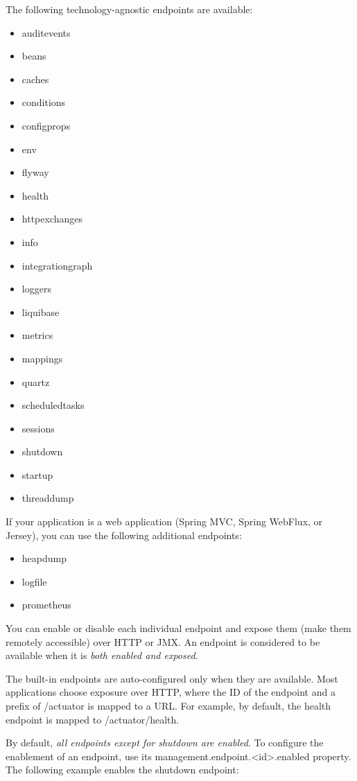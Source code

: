 \documentclass{scrartcl}
\begin{document}
The following technology-agnostic endpoints are available:

\begin{itemize}
    \item auditevents
    \item beans
    \item caches
    \item conditions
    \item configprops
    \item env
    \item flyway
    \item health
    \item httpexchanges
    \item info
    \item integrationgraph
    \item loggers
    \item liquibase
    \item metrics
    \item mappings
    \item quartz
    \item scheduledtasks
    \item sessions
    \item shutdown
    \item startup
    \item threaddump
\end{itemize}

If your application is a web application (Spring MVC, Spring WebFlux, or Jersey), you can use the following additional endpoints:

\begin{itemize}
    \item heapdump
    \item logfile
    \item prometheus
\end{itemize}

You can enable or disable each individual endpoint and expose them (make them remotely accessible) over HTTP or JMX. An endpoint is considered to be available when it is \textit{both enabled and exposed}.

The built-in endpoints are auto-configured only when they are available. Most applications choose exposure over HTTP, where the ID of the endpoint and a prefix of /actuator is mapped to a URL. For example, by default, the health endpoint is mapped to /actuator/health.

By default, \textit{all endpoints except for shutdown are enabled}. To configure the enablement of an endpoint, use its management.endpoint.\textless id\textgreater.enabled property. The following example enables the shutdown endpoint:
\end{document}
